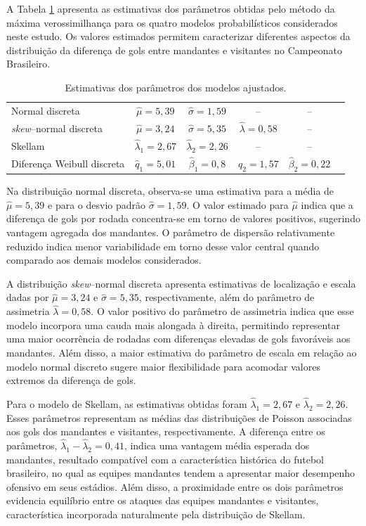 \documentclass[12pt,a4paper]{article}\usepackage[]{graphicx}\usepackage[]{xcolor}
\begin{document}
A Tabela \ref{tab:parametros} apresenta as estimativas dos parâmetros obtidas pelo método da máxima verossimilhança para os quatro modelos probabilísticos considerados neste estudo. Os valores estimados permitem caracterizar diferentes aspectos da distribuição da diferença de gols entre mandantes e visitantes no Campeonato Brasileiro.

\begin{table}[!ht]
\centering
\caption{Estimativas dos parâmetros dos modelos ajustados.}
\label{tab:parametros}
\begin{tabular}{lccccc}
\hline
Normal discreta &
$\hat{\mu}=5,39$ &
$\hat{\sigma}=1,59$ &
-- &
-- \\

\textit{skew}--normal discreta &
$\hat{\mu}=3,24$ &
$\hat{\sigma}=5,35$ &
$\hat{\lambda}=0,58$ &
-- \\

Skellam &
$\hat{\lambda}_1=2,67$ &
$\hat{\lambda}_2=2,26$ &
-- &
-- \\

Diferença Weibull discreta &
$\hat{q}_1=5,01$ &
$\hat{\beta}_1=0,8$ &
$\hat{q}_2=1,57$ &
$\hat{\beta}_2=0,22$ \\
\hline
\end{tabular}
\end{table}

Na distribuição normal discreta, observa-se uma estimativa para a média de $\hat{\mu}=5,39$ e para o desvio padrão $\hat{\sigma}=1,59$. O valor estimado para $\hat{\mu}$ indica que a diferença de gols por rodada concentra-se em torno de valores positivos, sugerindo vantagem agregada dos mandantes. O parâmetro de dispersão relativamente reduzido indica menor variabilidade em torno desse valor central quando comparado aos demais modelos considerados.

A distribuição \textit{skew}--normal discreta apresenta estimativas de localização e escala dadas por $\hat{\mu}=3,24$ e $\hat{\sigma}=5,35$, respectivamente, além do parâmetro de assimetria $\hat{\lambda}=0,58$. O valor positivo do parâmetro de assimetria indica que esse modelo incorpora uma cauda mais alongada à direita, permitindo representar uma maior ocorrência de rodadas com diferenças elevadas de gols favoráveis aos mandantes. Além disso, a maior estimativa do parâmetro de escala em relação ao modelo normal discreto sugere maior flexibilidade para acomodar valores extremos da diferença de gols.

Para o modelo de Skellam, as estimativas obtidas foram $\hat{\lambda}_1=2,67$ e $\hat{\lambda}_2=2,26$. Esses parâmetros representam as médias das distribuições de Poisson associadas aos gols dos mandantes e visitantes, respectivamente. A diferença entre os parâmetros,
$\hat{\lambda}_1-\hat{\lambda}_2=0,41$, indica uma vantagem média esperada dos mandantes, resultado compatível com a característica histórica do futebol brasileiro, no qual as equipes mandantes tendem a apresentar maior desempenho ofensivo em seus estádios. Além disso, a proximidade entre os dois parâmetros evidencia equilíbrio entre os ataques das equipes mandantes e visitantes, característica incorporada naturalmente pela distribuição de Skellam.
\end{document}
